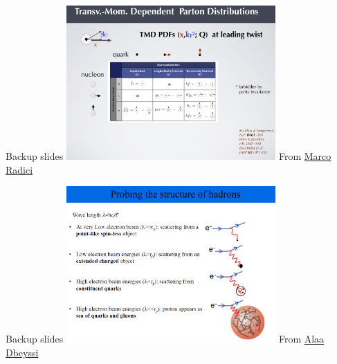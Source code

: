 \documentclass[aspectratio=169]{beamer}
\begin{document}
\begin{frame}{Backup slides}
\centering
\includegraphics[width=0.6\textwidth]{backup/tmd_lead_twist.png}
From \href{https://indico.cern.ch/event/797767/contributions/3682622/attachments/1965784/3268756/6_radici.pdf}{Marco Radici}
\end{frame}

\begin{frame}{Backup slides}
\centering
\includegraphics[width=0.6\textwidth]{backup/scale_walkdown.png}
From \href{https://indico.gsi.de/event/6430/sessions/4600/attachments/21407/26971/AD_NucleonStructure2.pdf}{Alaa Dbeyssi}
\end{frame}
\end{document}
